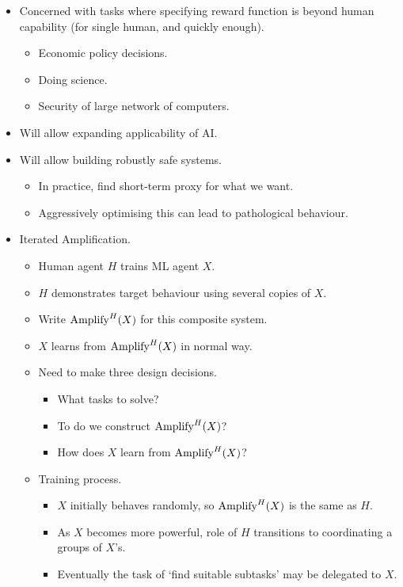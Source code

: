 \begin{itemize}
    \item Concerned with tasks where specifying reward function is beyond human capability (for single human, and quickly enough).
    \begin{itemize}
        \item Economic policy decisions.
        \item Doing science.
        \item Security of large network of computers.
    \end{itemize}
    \item Will allow expanding applicability of AI.
    \item Will allow building robustly safe systems.
    \begin{itemize}
        \item In practice, find short-term proxy for what we want.
        \item Aggressively optimising this can lead to pathological behaviour.
    \end{itemize}
    \item Iterated Amplification.
    \begin{itemize}
        \item Human agent $H$ trains ML agent $X$.
        \item $H$ demonstrates target behaviour using several copies of $X$.
        \item Write $\operatorname{\mathrm{Amplify}}^H(X)$ for this composite system.
        \item $X$ learns from $\operatorname{\mathrm{Amplify}}^H(X)$ in normal way.
        \item Need to make three design decisions.
        \begin{itemize}
            \item What tasks to solve?
            \item To do we construct $\operatorname{\mathrm{Amplify}}^H(X)$?
            \item How does $X$ learn from $\operatorname{\mathrm{Amplify}}^H(X)$?
        \end{itemize}
        \item Training process.
        \begin{itemize}
            \item $X$ initially behaves randomly, so $\operatorname{\mathrm{Amplify}}^H(X)$ is the same as $H$.
            \item As $X$ becomes more powerful, role of $H$ transitions to coordinating a groups of $X$'s.
            \item Eventually the task of `find suitable subtasks' may be delegated to $X$.

\end{itemize}
\end{itemize}
\end{itemize}
